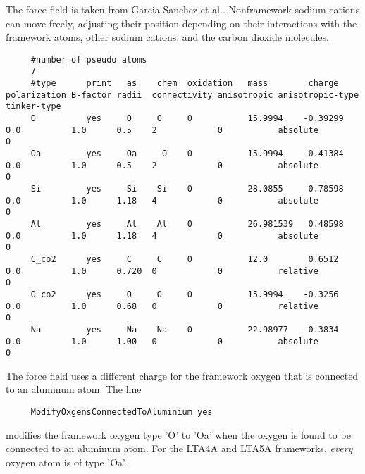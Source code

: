 \noindent
The force field is taken from Garcia-Sanchez et al.\cite{GarciaSanchez2009}.
Nonframework sodium cations can move freely, adjusting their position depending on their interactions with the framework atoms,
other sodium cations, and the carbon dioxide molecules.
\begin{tiny}
\begin{verbatim}
     #number of pseudo atoms
     7
     #type      print   as    chem  oxidation   mass        charge   polarization B-factor radii  connectivity anisotropic anisotropic-type   tinker-type
     O          yes     O     O     0           15.9994    -0.39299  0.0          1.0      0.5    2            0           absolute           0
     Oa         yes     Oa     O    0           15.9994    -0.41384  0.0          1.0      0.5    2            0           absolute           0
     Si         yes     Si    Si    0           28.0855     0.78598  0.0          1.0      1.18   4            0           absolute           0
     Al         yes     Al    Al    0           26.981539   0.48598  0.0          1.0      1.18   4            0           absolute           0
     C_co2      yes     C     C     0           12.0        0.6512   0.0          1.0      0.720  0            0           relative           0
     O_co2      yes     O     O     0           15.9994    -0.3256   0.0          1.0      0.68   0            0           relative           0
     Na         yes     Na    Na    0           22.98977    0.3834   0.0          1.0      1.00   0            0           absolute           0
\end{verbatim}
\end{tiny}
The force field uses a different charge for the framework oxygen that is connected to an aluminum atom.
The line
\begin{tiny}
\begin{verbatim}
     ModifyOxgensConnectedToAluminium yes
\end{verbatim}
\end{tiny}
modifies the framework oxygen type 'O' to 'Oa' when the oxygen is found to be connected to an aluminum atom.
For the LTA4A and LTA5A frameworks, \emph{every} oxygen atom is of type 'Oa'.

